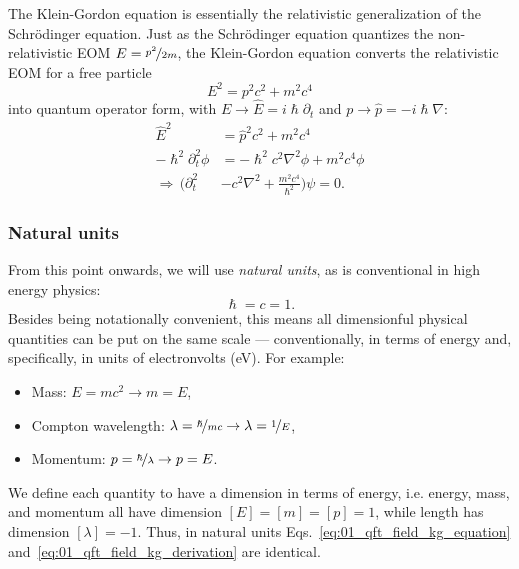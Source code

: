 The Klein-Gordon equation is essentially the relativistic generalization of the Schrödinger equation.
Just as the Schrödinger equation quantizes the non-relativistic EOM $E = \cnicefrac{p^2}{2m}$, the Klein-Gordon equation converts the relativistic EOM for a free particle
\begin{equation}
	\label{eq:01_qft_field_relativistic_eom}
	E^2 = p^2c^2 + m^2c^4
\end{equation}
into quantum operator form, with $E \rightarrow \hat{E} = i\hslash\partial_t$ and $p \rightarrow \hat p =  -i\hslash\nabla$:
\begin{equation}
	\label{eq:01_qft_field_kg_derivation}
	\begin{split}
		\hat E^2 &= \hat p^2c^2 + m^2c^4 \\
		-\hslash^2\partial_t^2\phi &= -\hslash^2c^2\nabla^2\phi + m^2c^4\phi \\
		\Rightarrow \, (\partial_t^2 &- c^2\nabla^2 + \frac{m^2c^4}{\hslash^2})\psi = 0.
	\end{split}
\end{equation}

\subsubsection{Natural units}

From this point onwards, we will use \textit{natural units}, as is conventional in high energy physics:
\begin{equation}
	\label{eq:01_qft_field_natural_units}
	\hslash = c = 1.
\end{equation}
Besides being notationally convenient, this means all dimensionful physical quantities can be put on the same scale --- conventionally, in terms of energy and, specifically, in units of electronvolts (eV).
For example:
\begin{itemize}
	\item Mass: $E = mc^2 \rightarrow m = E$,
	\item Compton wavelength: $\lambda = \cnicefrac{\hslash}{mc} \rightarrow \lambda = \cnicefrac{1}{E}$,
	\item Momentum: $p = \cnicefrac{\hbar}{\lambda} \rightarrow p = E$.
\end{itemize}
We define each quantity to have a dimension in terms of energy, i.e. energy, mass, and momentum all have dimension $[E] = [m] = [p] = 1$, while length has dimension $[\lambda] = -1$.
Thus, in natural units Eqs.~\ref{eq:01_qft_field_kg_equation} and~\ref{eq:01_qft_field_kg_derivation} are identical.

